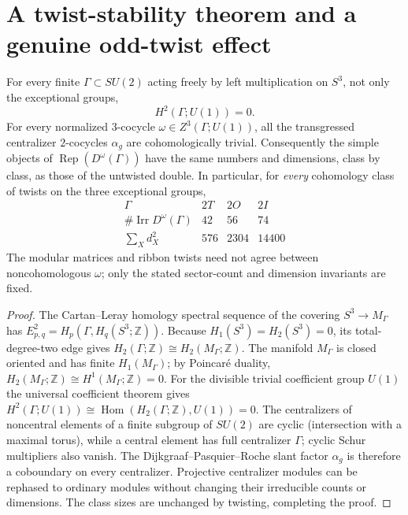 \documentclass[11pt]{article}
\begin{document}
\section{A twist-stability theorem and a genuine odd-twist effect}
\label{p1b:sec:v15-all-twists}

\begin{theorem}
\label{p1b:thm:v15-Schur-twist-stability}
For every finite $\Gamma\subset SU(2)$ acting freely by left
multiplication on $S^3$, not only the exceptional groups,
\[
\boxed{H^2(\Gamma;U(1))=0.}
\tag{T15.11}\label{p1b:eq:v15-Schur-zero}
\]
For every normalized $3$-cocycle $\omega\in Z^3(\Gamma;U(1))$,
all the transgressed centralizer $2$-cocycles $\alpha_g$
are cohomologically trivial.  Consequently the simple objects
of $\operatorname{Rep}(D^\omega(\Gamma))$ have the same numbers
and dimensions, class by class, as those of the untwisted double.
In particular, for \emph{every} cohomology class of twists on the
three exceptional groups,
\[
\boxed{
\begin{array}{c|ccc}
\Gamma&2T&2O&2I\\\hline
\#\operatorname{Irr}D^\omega(\Gamma)&42&56&74\\
\sum_Xd_X^2&576&2304&14400
\end{array}}
\tag{T15.12}\label{p1b:eq:v15-all-twist-counts}
\]
The modular matrices and ribbon twists need not agree between
noncohomologous $\omega$; only the stated sector-count and dimension
invariants are fixed.
\end{theorem}
\begin{proof}
The Cartan--Leray homology spectral sequence of the covering
$S^3\to M_\Gamma$ has
$E^2_{p,q}=H_p(\Gamma,H_q(S^3;\mathbb Z))$.
Because $H_1(S^3)=H_2(S^3)=0$, its total-degree-two edge gives
$H_2(\Gamma;\mathbb Z)\cong H_2(M_\Gamma;\mathbb Z)$.
The manifold $M_\Gamma$ is closed oriented and has finite
$H_1(M_\Gamma)$; by Poincar\'e duality,
$H_2(M_\Gamma;\mathbb Z)\cong H^1(M_\Gamma;\mathbb Z)=0$.
For the divisible trivial coefficient group $U(1)$ the universal
coefficient theorem gives
$H^2(\Gamma;U(1))\cong\operatorname{Hom}(H_2(\Gamma;\mathbb Z),U(1))=0$.
The centralizers of noncentral elements of a finite subgroup of
$SU(2)$ are cyclic (intersection with a maximal torus), while a
central element has full centralizer $\Gamma$; cyclic Schur
multipliers also vanish.
The Dijkgraaf--Pasquier--Roche slant factor $\alpha_g$
is therefore a coboundary on every centralizer.  Projective
centralizer modules can be rephased to ordinary modules without
changing their irreducible counts or dimensions.  The class sizes
are unchanged by twisting, completing the proof.
\end{proof}
\end{document}
